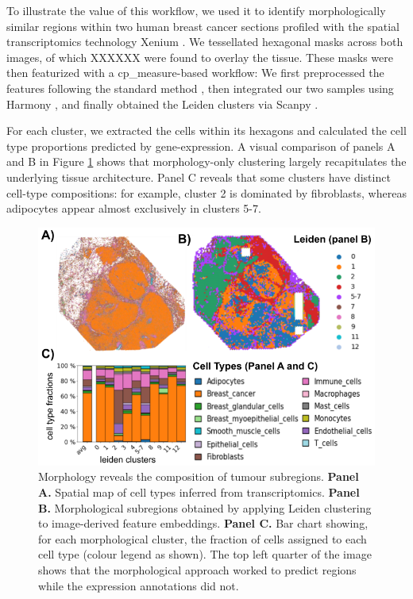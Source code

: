 \documentclass{article}
\begin{document}
To illustrate the value of this workflow, we used it to identify morphologically similar regions within two human breast cancer sections profiled with the spatial transcriptomics technology Xenium \citep{10x-Genomics2023-el}. We tessellated hexagonal masks across both images, of which XXXXXX were found to overlay the tissue. These masks were then featurized with a cp\_measure-based workflow: We first preprocessed the features following the standard method
\citep{serranoReproducibleImagebasedProfiling2025}, then integrated our two samples using Harmony \citep{Korsunsky2019-Harmony}, and finally obtained the Leiden clusters via Scanpy \citep{wolfSCANPYLargescaleSinglecell2018}. 

For each cluster, we extracted the cells within its hexagons and calculated the cell type proportions predicted by gene-expression. A visual comparison of panels A and B in Figure \ref{fig:spatial_omics} shows that morphology-only clustering largely recapitulates the underlying tissue architecture. Panel C reveals that some clusters have distinct cell-type compositions: for example, cluster 2 is dominated by fibroblasts, whereas adipocytes appear almost exclusively in clusters 5-7.

\begin{figure}[htbp]
\centering
\includegraphics[width=.99\linewidth]{./figs/fig_4_spatial.png}
\caption{\label{fig:spatial_omics}{}Morphology reveals the composition of tumour subregions. \textbf{Panel A.} Spatial map of cell types inferred from transcriptomics. \textbf{Panel B.} Morphological subregions obtained by applying Leiden clustering to image-derived feature embeddings. \textbf{Panel C.} Bar chart showing, for each morphological cluster, the fraction of cells assigned to each cell type (colour legend as shown). The top left quarter of the image shows that the morphological approach worked to predict regions while the expression annotations did not.}
\end{figure}
\end{document}

